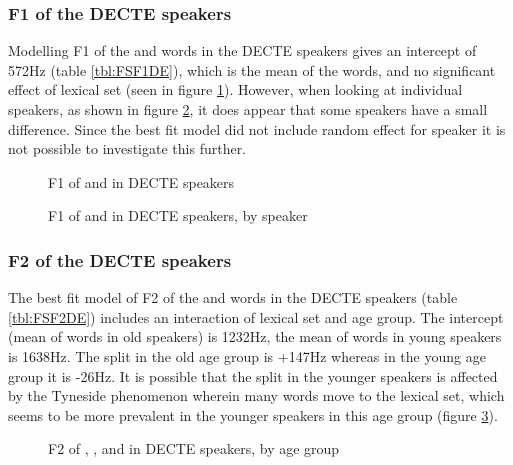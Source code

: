 \documentclass[../../../00.FullDoc/tex/ThesisSkeleton-draft2]{subfiles}
\begin{document}
\subsubsection{F1 of the DECTE speakers}
Modelling F1 of the \foot{} and \strutt{} words in the DECTE speakers gives an intercept of 572Hz (table \ref{tbl:FSF1DE}), which is the mean of the \foot{} words, and no significant effect of lexical set (seen in figure \ref{fig:FSF1DE}). However, when looking at individual speakers, as shown in figure \ref{fig:FSF1DE-id}, it does appear that some speakers have a small difference. Since the best fit model did not include random effect for speaker it is not possible to investigate this further.



\begin{figure}
	\centering
	
	\caption{F1 of \foot{} and \strutt{} in DECTE speakers} \label{fig:FSF1DE}
\end{figure}

\begin{figure}
	\centering
	
	\caption{F1 of \foot{} and \strutt{} in DECTE speakers, by speaker} \label{fig:FSF1DE-id}
\end{figure}


\subsubsection{F2  of the DECTE speakers}
The best fit model of F2 of the \foot{} and \strutt{} words in the DECTE speakers (table \ref{tbl:FSF2DE}) includes an interaction of lexical set and age group. The intercept (mean of \foot{} words in old speakers) is 1232Hz, the mean of \foot{} words in young speakers is 1638Hz. The split in the old age group is +147Hz whereas in the young age group it is -26Hz. It is possible that the split in the younger speakers is affected by the Tyneside phenomenon wherein many \foot{} words move to the  lexical set, which seems to be more prevalent in the younger speakers in this age group (figure \ref{fig:FSGF2DE-age}).




\begin{figure}
	\centering
	
	\caption{F2 of \foot{}, \strutt{}, and \goose{} in DECTE speakers, by age group} \label{fig:FSGF2DE-age}
\end{figure}
\end{document}
